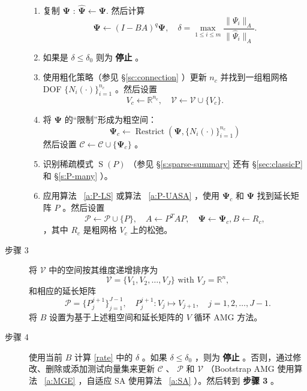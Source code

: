 \documentclass[12pt]{acta_2011xz}
\newcommand{\sparse}{\ensuremath{\operatorname{S}}}
\newcommand{\dof}{\ensuremath{N}}
\begin{document}
\begin{description}
\begin{enumerate}
    \item   复制          $\bm{\Psi}$          :          $ \hat{\bm{\Psi}}\leftarrow\bm{\Psi}. $          然后计算
   \begin{equation}\label{rate}
          \bm{\Psi}\leftarrow (I-BA)^q \bm{\Psi}, \quad
          \delta =\max_{1\le i\le m}\frac{\|\Psi_i\|_A}{\|\hat \Psi_i\|_A}.
\end{equation}      \item   如果是          $\delta \le \delta_0$          则为  {    \bf    停止   }  。   \item   使用粗化策略（参见    \S       \ref{sc:connection}    ）更新          $n_c$          并找到一组粗网格 DOF          $ \{ \dof_i(\cdot) \} _{i=1}^{n_c}$          。然后设置
         $$V_c\leftarrow \mathbb{R}^{n_c}, \quad \mathcal V \leftarrow \mathcal V\cup  \{ V_c \} . $$            \item   将          $\bm\Psi$          的“限制”形成为粗空间：
   \begin{equation*}
        \bm{\Psi}_c\leftarrow \operatorname{Restrict}(\bm{\Psi},  \{ \dof_i(\cdot) \} _{i=1}^{n_c})
    \end{equation*}    然后设置          $\mathcal C\leftarrow \mathcal C\cup  \{ \bm{\Psi}_c \} $          。   \item   识别稀疏模式          $\sparse(P)$          （参见    \S       \ref{s:sparse-summary}    还有    \S       \ref{sec:classicP}    和    \S       \ref{s:P-many}    ）。   \item   应用算法~    \ref{a:P-LS}    或算法~    \ref{a:P-UASA}   ，使用          $\bm{\Psi}_c$          和          $\bm{\Psi}$          找到延长矩阵          $P$         。然后设置 
         $$\mathcal P\leftarrow \mathcal P\cup  \{ P \} , \quad A\leftarrow P^TAP, \quad \bm{\Psi}\leftarrow \bm{\Psi}_c, B\leftarrow R_c, $$         ，其中          $R_c$          是粗网格          $V_c$          上的松弛。  \end{enumerate}    
   \item    [步骤 3] 将    $\mathcal V$    中的空间按其维度递增排序为
   \begin{equation*}
            \mathcal V= \{ V_1, V_2, \dots,V_J \}  \text{ with }  V_J=\mathbb{R}^n,
        \end{equation*}    和相应的延长矩阵 
   \begin{equation*}
            \mathcal P= \{ P_j^{j+1} \} _{j=1}^{J-1}, \quad P_j^{j+1} : V_j\mapsto V_{j+1}, \quad j=1, 2, \dots, J-1.
        \end{equation*}    将    $B$    设置为基于上述粗空间和延长矩阵的    $V$    循环 AMG 方法。
   \item    [步骤 4] 使用当前    $B$    计算    \eqref{rate}    中的    $\delta$    。如果
   $\delta \le \delta_0$    ，则为  {    \bf    停止   }  。否则，通过修改、删除或添加测试向量集来更新
   $\mathcal C$    、   $\mathcal P$    和    $\mathcal V$    （Bootstrap AMG 使用算法~    \ref{a:MGE}    ，自适应 SA 使用算法~    \ref{a:SA}    ）。然后转到  {    \bf    步骤 3   }  。  \end{description}     
\end{document}
